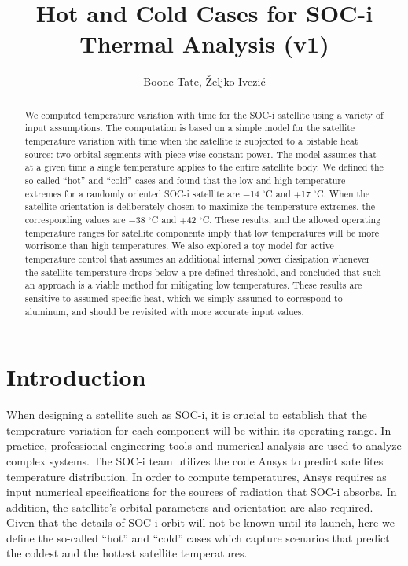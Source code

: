 \documentclass[]{aastex62}
\begin{document}
\title{Hot and Cold Cases for SOC-i Thermal Analysis (v1)}  
 

\author{Boone Tate, \v{Z}eljko Ivezi\'{c}}

\begin{abstract}
We computed temperature variation with time for the SOC-i satellite using a variety of input
assumptions. The computation is based on a simple model for the satellite temperature variation 
with time when the satellite is subjected to a bistable heat source: two orbital segments with 
piece-wise constant power. The model assumes that at a given time a single temperature applies 
to the entire satellite body. 
We defined the so-called ``hot'' and ``cold'' cases and found that the low and high temperature 
extremes for a randomly oriented SOC-i satellite are $-$14 $^\circ$C and $+$17 $^\circ$C. When the 
satellite orientation is deliberately chosen to maximize the temperature extremes, the corresponding 
values are $-$38 $^\circ$C and $+$42 $^\circ$C. These results, and the allowed operating temperature
ranges for satellite components imply that low temperatures will be more worrisome than high
temperatures. We also explored a toy model for active temperature control that assumes an additional
internal power dissipation whenever the satellite temperature drops below a pre-defined threshold,
and concluded that such an approach is a viable method for mitigating low temperatures.
These results are sensitive to assumed specific heat, which we simply assumed to correspond to 
aluminum, and should be revisited with more accurate input values. 
\end{abstract}



\section{Introduction}
 
When designing a satellite such as SOC-i, it is crucial to establish that the temperature variation for 
each component will be within its operating range. In practice, professional engineering tools and 
numerical analysis are used to analyze complex systems. The SOC-i team utilizes the code Ansys
to predict satellites temperature distribution. In order to compute temperatures, Ansys requires
as input numerical specifications for the sources of radiation that SOC-i absorbs. In addition, 
the satellite's orbital parameters and orientation are also required. Given that the details of 
SOC-i orbit will not be known until its launch, here we define the so-called ``hot'' and ``cold'' 
cases which capture scenarios that predict the coldest and the hottest satellite temperatures. 
 
\end{document}
